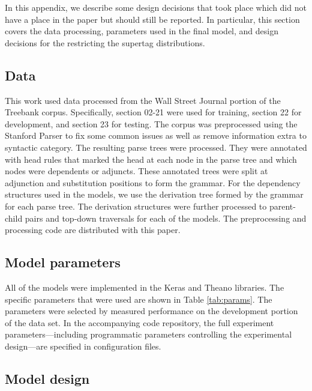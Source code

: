 \documentclass[11pt]{article}
\begin{document}
In this appendix, we describe some design decisions that took place which did not have a place in the paper but should still be reported.  In particular, this section covers the data processing, parameters used in the final model, and design decisions for the restricting the supertag distributions. 

\subsection{Data}

This work used data processed from the Wall Street Journal portion of the Treebank corpus. Specifically, section 02-21 were used for training, section 22 for development, and section 23 for testing.  The corpus was preprocessed using the Stanford Parser to fix some common issues as well as remove information extra to syntactic category.  The resulting parse trees were processed.  They were annotated with head rules that marked the head at each node in the parse tree and which nodes were dependents or adjuncts.  These annotated trees were split at adjunction and substitution positions to form the grammar.  For the dependency structures used in the models, we use the derivation tree formed by the grammar for each parse tree.  The derivation structures were further processed to parent-child pairs and top-down traversals for each of the models.  The preprocessing and processing code are distributed with this paper. 

\subsection{Model parameters}

All of the models were implemented in the Keras \cite{chollet2015keras} and Theano \cite{theano} libraries.  The specific parameters that were used are shown in Table \ref{tab:params}.  The parameters were selected by measured performance on the development portion of the data set.  In the accompanying code repository, the full experiment parameters---including programmatic parameters controlling the experimental design---are specified in configuration files. 

\subsection{Model design}
\end{document}
